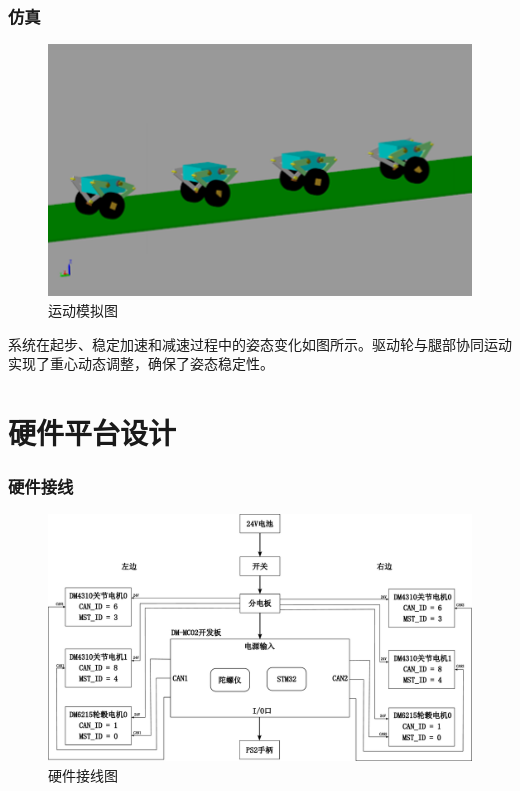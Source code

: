 \documentclass{beamer}
\begin{document}
	\begin{frame}
	\frametitle{仿真}
	\begin{figure}[t]
		\centering
		\includegraphics[width=0.7\linewidth]{img/chapter3/move}
		\captionsetup{font=scriptsize}
		
		\caption{运动模拟图}
	\end{figure}
	\vspace{-5pt} 
	系统在起步、稳定加速和减速过程中的姿态变化如图所示。驱动轮与腿部协同运动实现了重心动态调整，确保了姿态稳定性。
\end{frame}

	
	
	\section[硬件平台设计]{硬件平台设计}
	\begin{frame}
		\frametitle{硬件接线}
		
		\begin{figure}
			\centering
			\includegraphics[width=\linewidth]{img/chapter4/hardware.pdf}
			\captionsetup{font=scriptsize}
			
			\caption{硬件接线图}
		\end{figure}

		
		
		
	\end{frame}
	
\end{document}
